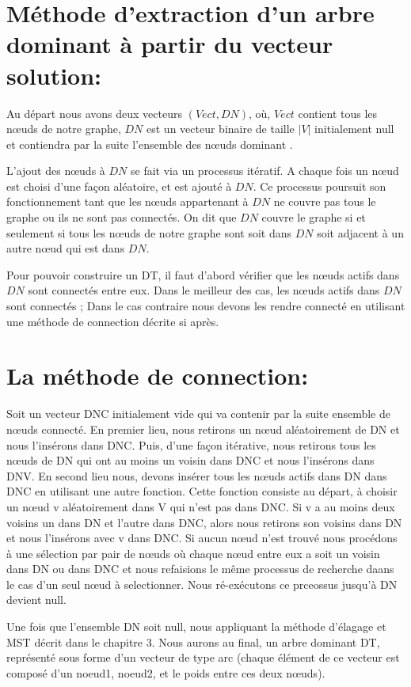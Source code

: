 \section{Méthode d'extraction d'un arbre dominant à partir du vecteur solution:}
Au départ nous avons deux vecteurs $(Vect, DN)$, où, $Vect$ contient tous les nœuds de notre graphe, $DN$ est un vecteur binaire de taille $|V|$ initialement null et contiendra par la suite l’ensemble des nœuds dominant .

L’ajout des nœuds à $DN$ se fait via un processus itératif. A chaque fois un nœud est choisi d’une façon aléatoire,  et est ajouté à $DN$. Ce processus poursuit son fonctionnement tant que les nœuds appartenant à $DN$ ne couvre pas tous le graphe ou ils ne sont pas  connectés. On dit que $DN$ couvre le graphe si et seulement si tous les nœuds de notre graphe sont soit dans $DN$ soit adjacent à un autre nœud qui est dans $DN$.

Pour pouvoir construire un DT, il faut d’abord vérifier  que les nœuds actifs dans $DN$  sont connectés entre eux. Dans le meilleur des cas, les nœuds actifs dans $DN$ sont connectés ; Dans le cas contraire nous devons les rendre connecté en utilisant une méthode de connection décrite si après.

\section{La méthode de connection:}
Soit un vecteur DNC initialement vide qui va contenir par la suite ensemble de nœuds connecté. En premier lieu, nous retirons un nœud aléatoirement de DN et nous l’insérons dans DNC. Puis, d’une façon itérative, nous retirons tous les nœuds de DN qui ont au moins un voisin dans DNC et nous l’insérons dans DNV. En second lieu nous, devons insérer tous les nœuds actifs dans DN dans DNC en utilisant une autre fonction. Cette fonction consiste au départ, à choisir un nœud v aléatoirement dans V qui n’est pas dans DNC. Si v a au moins deux voisins un dans DN et l’autre dans DNC, alors nous retirons son voisins dans DN et nous l’insérons  avec v dans DNC. Si aucun nœud n’est trouvé nous procédons à une sélection par pair de nœuds où chaque nœud entre eux a soit un voisin dans DN ou dans DNC et nous refaisions le même processus de recherche daans le cas d’un seul nœud à selectionner. Nous ré-exécutons ce prceossus jusqu'à DN devient null.

Une fois que l’ensemble DN soit null, nous appliquant la méthode d’élagage et MST décrit dans le chapitre 3. Nous aurons au final, un arbre dominant DT, représenté sous forme d’un vecteur de type arc (chaque élément de ce vecteur est composé d’un noeud1, noeud2, et le poids entre ces deux nœuds).


